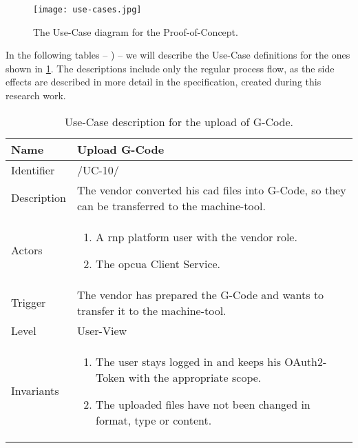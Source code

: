 \documentclass[
a4paper,
twoside,
headsepline,
cleardoublepage=empty,
parskip=half,
draft=false
]{scrbook}
\begin{document}
				\begin{figure}[htbp]
					\centering
					\texttt{[image: use-cases.jpg]}
					\caption{The Use-Case diagram for the Proof-of-Concept.}
					\label{fig:use_cases}
				\end{figure}

				In the following tables -- ) -- we will describe the Use-Case definitions for the ones shown in \cref{fig:use_cases}. The descriptions include only the regular process flow, as the side effects are described in more detail in the specification, created during this research work.

				\begin{table}[hbtp]
					\centering
					\caption{Use-Case description for the upload of G-Code.}
					\label{tab:use_case_upload}
					\begin{tabular}{L R}%
						\toprule
						Name & Upload G-Code
						\\ \midrule
						Identifier & /UC-10/
						\\ \midrule
						Description & The vendor converted his \gls{cad} files into G-Code, so they can be transferred to the machine-tool.
						\\ \midrule
						Actors & \begin{enumerate}\item A \gls{rnp} platform user with the vendor role. \item The \gls{opcua} Client Service.\end{enumerate}
						\\ \midrule
						Trigger & The vendor has prepared the G-Code and wants to transfer it to the machine-tool.
						\\ \midrule
						Level & User-View
						\\ \midrule
						Invariants & \begin{enumerate}\item The user stays logged in and keeps his OAuth2-Token with the appropriate scope. \item The uploaded files have not been changed in format, type or content.\end{enumerate}
						\\ \midrule

\end{tabular}
\end{table}
\end{document}
